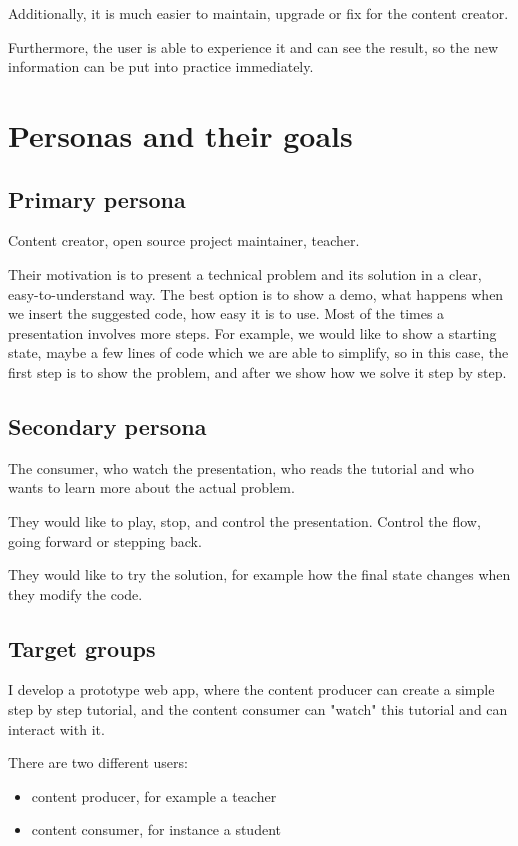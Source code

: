 \documentclass[12pt, a4paper, oneside, openright, medskipamount]{report}
\begin{document}
Additionally, it is much easier to maintain, upgrade or fix for the content creator.

Furthermore, the user is able to experience it and can see the result, so the new information can be put into practice immediately.

\section{Personas and their goals}

\subsection{Primary persona}

Content creator, open source project maintainer, teacher.

Their motivation is to present a technical problem and its solution in a clear, easy-to-understand way. The best option is to show a demo, what happens when we insert the suggested code, how easy it is to use. Most of the times a presentation involves more steps. For example, we would like to show a starting state, maybe a few lines of code which we are able to simplify, so in this case, the first step is to show the problem, and after we show how we solve it step by step.

\subsection{Secondary persona}

The consumer, who watch the presentation, who reads the tutorial and who wants to learn more about the actual problem.

They would like to play, stop, and control the presentation. Control the flow, going forward or stepping back.

They would like to try the solution, for example how the final state changes when they modify the code.

\subsection{Target groups}

I develop a prototype web app, where the content producer can create a simple step by step tutorial, and the content consumer can "watch" this tutorial and can interact with it.

There are two different users:
\begin{itemize}[noitemsep]
\item content producer, for example a teacher
\item content consumer, for instance a student
\end{itemize}
\end{document}
